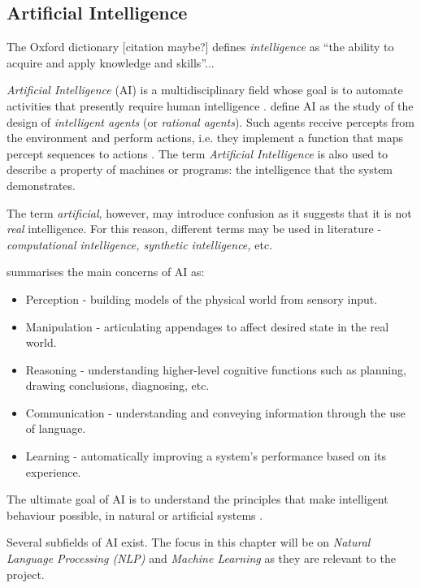 \documentclass[12pt,a4paper]{article}
\begin{document}
\subsection{Artificial Intelligence}
The Oxford dictionary [citation maybe?] defines \textit{intelligence} as \enquote{the ability to acquire and apply knowledge and skills}...

\textit{Artificial Intelligence} (AI) is a multidisciplinary field whose goal is to automate activities that presently require human intelligence \cite{williams1983brief}. \cite{Poole:1997:CIL:275594} define AI as the study of the design of \textit{intelligent agents} (or \textit{rational agents}). Such agents receive percepts from the environment and perform actions, i.e. they implement a function that maps percept sequences to actions \cite{RusselStuart}. The term \textit{Artificial Intelligence} is also used to describe a property of machines or programs: the intelligence that the system demonstrates.

The term \textit{artificial}, however, may introduce confusion as it suggests that it is not \textit{real} intelligence. For this reason, different terms may be used in literature - \textit{computational intelligence, synthetic intelligence,} etc.

\cite{williams1983brief} summarises the main concerns of AI as:
\begin{itemize}
    \item Perception - building models of the physical world from sensory input.
    \item Manipulation - articulating appendages to affect desired state in the real world.
    \item Reasoning - understanding higher-level cognitive functions such as planning, drawing conclusions, diagnosing, etc.
    \item Communication - understanding and conveying information through the use of language.
    \item Learning - automatically improving a system's performance based on its experience.
\end{itemize}

The ultimate goal of AI is to understand the principles that make intelligent behaviour possible, in natural or artificial systems \cite{Poole:1997:CIL:275594}.

Several subfields of AI exist. The focus in this chapter will be on \textit{Natural Language Processing (NLP)} and \textit{Machine Learning} as they are relevant to the project.
\end{document}
